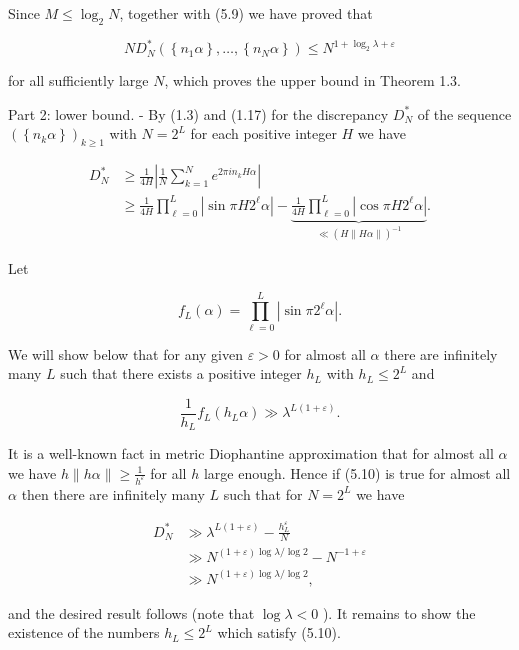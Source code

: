\documentclass[10pt]{article}
\newcommand{\1}{\mathbf{1}}
\begin{document}
Since $M \leqslant \log _{2} N$, together with (5.9) we have proved that

$$
N D_{N}^{*}\left(\left\{n_{1} \alpha\right\}, \ldots,\left\{n_{N} \alpha\right\}\right) \leqslant N^{1+\log _{2} \lambda+\varepsilon}
$$

for all sufficiently large $N$, which proves the upper bound in Theorem 1.3.

Part 2: lower bound. - By (1.3) and (1.17) for the discrepancy $D_{N}^{*}$ of the sequence $\left(\left\{n_{k} \alpha\right\}\right)_{k \geqslant 1}$ with $N=2^{L}$ for each positive integer $H$ we have

$$
\begin{aligned}
D_{N}^{*} & \geqslant \frac{1}{4 H}\left|\frac{1}{N} \sum_{k=1}^{N} e^{2 \pi i n_{k} H \alpha}\right| \\
& \geqslant \frac{1}{4 H} \prod_{\ell=0}^{L}\left|\sin \pi H 2^{\ell} \alpha\right|-\underbrace{\frac{1}{4 H} \prod_{\ell=0}^{L}\left|\cos \pi H 2^{\ell} \alpha\right|}_{\ll(H\|H \alpha\|)^{-1}} .
\end{aligned}
$$

Let

$$
f_{L}(\alpha)=\prod_{\ell=0}^{L}\left|\sin \pi 2^{\ell} \alpha\right| .
$$

We will show below that for any given $\varepsilon>0$ for almost all $\alpha$ there are infinitely many $L$ such that there exists a positive integer $h_{L}$ with $h_{L} \leqslant 2^{L}$ and


\begin{equation*}
\frac{1}{h_{L}} f_{L}\left(h_{L} \alpha\right) \gg \lambda^{L(1+\varepsilon)} . \tag{5.10}
\end{equation*}


It is a well-known fact in metric Diophantine approximation that for almost all $\alpha$ we have $h\|h \alpha\| \geqslant \frac{1}{h^{\varepsilon}}$ for all $h$ large enough. Hence if (5.10) is true for almost all $\alpha$ then there are infinitely many $L$ such that for $N=2^{L}$ we have


\begin{align*}
D_N^*
&\gg\lambda^{L(1+\varepsilon)}-\frac{h_L^\varepsilon}{N} \tag{5.11}\\
&\gg N^{(1+\varepsilon)\log\lambda/\log2}-N^{-1+\varepsilon}\\
&\gg N^{(1+\varepsilon)\log\lambda/\log2},
\end{align*}


and the desired result follows (note that $\log \lambda<0$ ). It remains to show the existence of the numbers $h_{L} \leqslant 2^{L}$ which satisfy (5.10).
\end{document}
